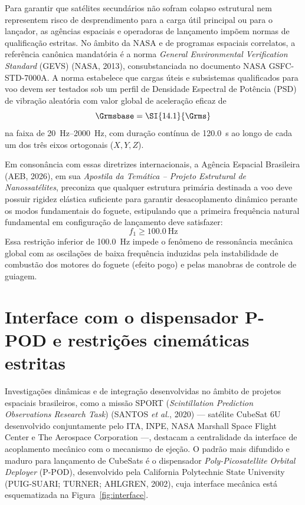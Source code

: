 Para garantir que satélites secundários não sofram colapso estrutural nem representem risco de desprendimento para a carga útil principal ou para o lançador, as agências espaciais e operadoras de lançamento impõem normas de qualificação estritas. No âmbito da NASA e de programas espaciais correlatos, a referência canônica mandatória é a norma \textit{General Environmental Verification Standard} (GEVS) (NASA, 2013), consubstanciada no documento NASA GSFC-STD-7000A. A norma estabelece que cargas úteis e subsistemas qualificados para voo devem ser testados sob um perfil de Densidade Espectral de Potência (PSD) de vibração aleatória com valor global de aceleração eficaz de
\begin{equation}
  \Grmsbase = \SI{14.1}{\Grms}
  \label{eq:intro-grms}
\end{equation}
na faixa de \SIrange{20}{2000}{\hertz}, com duração contínua de \SI{120.0}{\second} ao longo de cada um dos três eixos ortogonais ($X, Y, Z$). 

Em consonância com essas diretrizes internacionais, a Agência Espacial Brasileira (AEB, 2026), em sua \textit{Apostila da Temática -- Projeto Estrutural de Nanossatélites}, preconiza que qualquer estrutura primária destinada a voo deve possuir rigidez elástica suficiente para garantir desacoplamento dinâmico perante os modos fundamentais do foguete, estipulando que a primeira frequência natural fundamental em configuração de lançamento deve satisfazer:
\begin{equation}
  f_1 \ge \SI{100.0}{\hertz}
  \label{eq:intro-f1}
\end{equation}
Essa restrição inferior de \SI{100.0}{\hertz} impede o fenômeno de ressonância mecânica global com as oscilações de baixa frequência induzidas pela instabilidade de combustão dos motores do foguete (efeito pogo) e pelas manobras de controle de guiagem.

\section{Interface com o dispensador P-POD e restrições cinemáticas estritas}
\label{sec:intro-ppod}

Investigações dinâmicas e de integração desenvolvidas no âmbito de projetos espaciais brasileiros, como a missão SPORT (\textit{Scintillation Prediction Observations Research Task}) (SANTOS \textit{et al.}, 2020) — satélite CubeSat 6U desenvolvido conjuntamente pelo ITA, INPE, NASA Marshall Space Flight Center e The Aerospace Corporation —, destacam a centralidade da interface de acoplamento mecânico com o mecanismo de ejeção. O padrão mais difundido e maduro para lançamento de CubeSats é o dispensador \textit{Poly-Picosatellite Orbital Deployer} (P-POD), desenvolvido pela California Polytechnic State University (PUIG-SUARI; TURNER; AHLGREN, 2002), cuja interface mecânica está esquematizada na Figura~\ref{fig:interface}.

